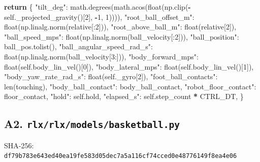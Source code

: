 \documentclass[
  chinese,
  11pt,
  letterpaper,
]{article}
\newenvironment{Shaded}{\begin{snugshade}}{\end{snugshade}}
\newcommand{\BuiltInTok}[1]{#1}
\newcommand{\ControlFlowTok}[1]{\textcolor[rgb]{0.13,0.29,0.53}{\textbf{#1}}}
\newcommand{\DecValTok}[1]{\textcolor[rgb]{0.00,0.00,0.81}{#1}}
\newcommand{\NormalTok}[1]{#1}
\newcommand{\OperatorTok}[1]{\textcolor[rgb]{0.81,0.36,0.00}{\textbf{#1}}}
\newcommand{\StringTok}[1]{\textcolor[rgb]{0.31,0.60,0.02}{#1}}
\newcommand{\VariableTok}[1]{\textcolor[rgb]{0.00,0.00,0.00}{#1}}
\renewenvironment{Shaded}{\par\smallskip}{\par\smallskip}
\begin{document}
\begin{Shaded}
\begin{Highlighting}[]
        \ControlFlowTok{return}\NormalTok{ \{}
            \StringTok{"tilt\_deg"}\NormalTok{: math.degrees(math.acos(}\BuiltInTok{float}\NormalTok{(np.clip(}\OperatorTok{{-}}\VariableTok{self}\NormalTok{.\_projected\_gravity()[}\DecValTok{2}\NormalTok{], }\OperatorTok{{-}}\DecValTok{1}\NormalTok{, }\DecValTok{1}\NormalTok{)))),}
            \StringTok{"root\_ball\_offset\_m"}\NormalTok{: }\BuiltInTok{float}\NormalTok{(np.linalg.norm(relative[:}\DecValTok{2}\NormalTok{])),}
            \StringTok{"root\_above\_ball\_m"}\NormalTok{: }\BuiltInTok{float}\NormalTok{(relative[}\DecValTok{2}\NormalTok{]),}
            \StringTok{"ball\_speed\_mps"}\NormalTok{: }\BuiltInTok{float}\NormalTok{(np.linalg.norm(ball\_velocity[:}\DecValTok{2}\NormalTok{])),}
            \StringTok{"ball\_position"}\NormalTok{: ball\_pos.tolist(),}
            \StringTok{"ball\_angular\_speed\_rad\_s"}\NormalTok{: }\BuiltInTok{float}\NormalTok{(np.linalg.norm(ball\_velocity[}\DecValTok{3}\NormalTok{:])),}
            \StringTok{"body\_forward\_mps"}\NormalTok{: }\BuiltInTok{float}\NormalTok{(}\VariableTok{self}\NormalTok{.body\_lin\_vel()[}\DecValTok{0}\NormalTok{]),}
            \StringTok{"body\_lateral\_mps"}\NormalTok{: }\BuiltInTok{float}\NormalTok{(}\VariableTok{self}\NormalTok{.body\_lin\_vel()[}\DecValTok{1}\NormalTok{]),}
            \StringTok{"body\_yaw\_rate\_rad\_s"}\NormalTok{: }\BuiltInTok{float}\NormalTok{(}\VariableTok{self}\NormalTok{.\_gyro[}\DecValTok{2}\NormalTok{]),}
            \StringTok{"foot\_ball\_contacts"}\NormalTok{: }\BuiltInTok{len}\NormalTok{(touching),}
            \StringTok{"body\_ball\_contact"}\NormalTok{: body\_ball\_contact,}
            \StringTok{"robot\_floor\_contact"}\NormalTok{: floor\_contact,}
            \StringTok{"hold"}\NormalTok{: }\VariableTok{self}\NormalTok{.hold,}
            \StringTok{"elapsed\_s"}\NormalTok{: }\VariableTok{self}\NormalTok{.step\_count }\OperatorTok{*}\NormalTok{ CTRL\_DT,}
\NormalTok{        \}}
\end{Highlighting}
\end{Shaded}

\subsection{\texorpdfstring{A2.
\texttt{rlx/\allowbreak{}rlx/\allowbreak{}models/\allowbreak{}basketba\allowbreak{}ll.py}}{A2. }}\label{a2.-rlxrlxmodelsbasketball.py}

SHA-256:
\texttt{df79b783\allowbreak{}e643ed40\allowbreak{}ea19fe58\allowbreak{}3d05dec7\allowbreak{}a5a116cf\allowbreak{}74cced0e\allowbreak{}48776149\allowbreak{}f8ea4e06\allowbreak{}}
\end{document}
